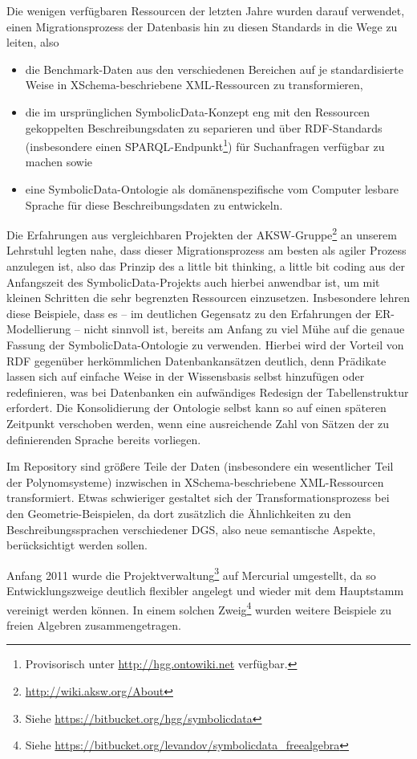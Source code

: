 \documentclass{article}
\newcommand{\SD}{{\sc Symbolic\-Data}}
\begin{document}
Die wenigen verfügbaren Ressourcen der letzten Jahre wurden darauf verwendet,
einen Migrationsprozess der Datenbasis hin zu diesen Standards in die Wege zu
leiten, also 
\begin{itemize}\raggedright
\item die Benchmark-Daten aus den verschiedenen Bereichen auf je
  standardisierte Weise in XSchema-beschriebene XML-Ressourcen zu
  transformieren, 
\item die im ursprünglichen \SD-Konzept eng mit den Ressourcen gekoppelten
  Beschreibungsdaten zu separieren und über RDF-Standards (insbesondere einen
  SPARQL-Endpunkt\footnote{Provisorisch unter \url{http://hgg.ontowiki.net}
    verfügbar.}) für Suchanfragen verfügbar zu machen sowie
\item eine \SD-Ontologie als domänenspezifische vom Computer lesbare Sprache
  für diese Beschreibungsdaten zu entwickeln.
\end{itemize}
Die Erfahrungen aus vergleichbaren Projekten der
AKSW-Gruppe\footnote{\url{http://wiki.aksw.org/About}} an unserem Lehrstuhl
legten nahe, dass dieser Migrationsprozess am besten als agiler Prozess
anzulegen ist, also das Prinzip des {\glqq}a little bit thinking, a little bit
coding{\grqq} aus der Anfangszeit des \SD-Projekts auch hierbei anwendbar ist,
um mit kleinen Schritten die sehr begrenzten Ressourcen einzusetzen.
Insbesondere lehren diese Beispiele, dass es -- im deutlichen Gegensatz zu den
Erfahrungen der ER-Modellierung -- nicht sinnvoll ist, bereits am Anfang zu
viel Mühe auf die genaue Fassung der \SD-Ontologie zu verwenden. Hierbei wird
der Vorteil von RDF gegenüber herkömmlichen Datenbankansätzen deutlich, denn
Prädikate lassen sich auf einfache Weise in der Wissensbasis selbst hinzufügen
oder redefinieren, was bei Datenbanken ein aufwändiges Redesign der
Tabellenstruktur erfordert. Die Konsolidierung der Ontologie selbst kann so
auf einen späteren Zeitpunkt verschoben werden, wenn eine ausreichende Zahl
von {\glqq}Sätzen{\grqq} der zu definierenden Sprache bereits vorliegen.

Im Repository sind größere Teile der Daten (insbesondere ein wesentlicher Teil
der Polynomsysteme) inzwischen in XSchema-beschriebene XML-Ressourcen
transformiert. Etwas schwieriger gestaltet sich der Transformationsprozess bei
den Geometrie-Beispielen, da dort zusätzlich die Ähnlichkeiten zu den
Beschreibungssprachen verschiedener DGS, also neue semantische Aspekte,
berücksichtigt werden sollen.

Anfang 2011 wurde die Projektverwaltung\footnote{Siehe
  \url{https://bitbucket.org/hgg/symbolicdata}} auf Mercurial umgestellt, da
so Entwicklungszweige deutlich flexibler angelegt und wieder mit dem
Hauptstamm vereinigt werden können.  In einem solchen Zweig\footnote{Siehe
  \url{https://bitbucket.org/levandov/symbolicdata_freealgebra}} wurden
weitere Beispiele zu freien Algebren zusammengetragen.
\end{document}
